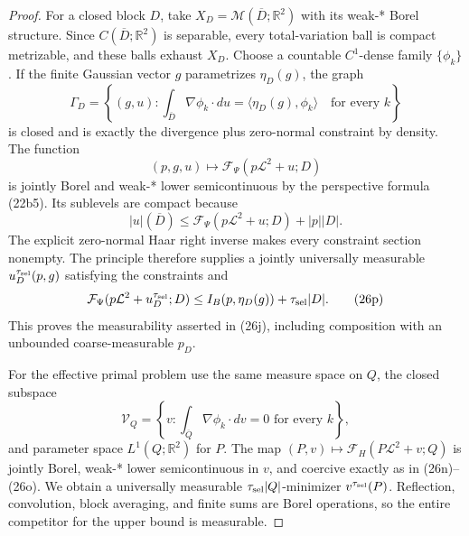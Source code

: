 \documentclass{aomart}
\theoremstyle{definition}
\newcommand{\1}{\mathbf 1}
\begin{document}
\begin{proof}
For a closed block $D$, take
$X_ D=\mathcal M(\overline D;\mathbb R^2)$ with its weak-* Borel
structure.  Since $C(\overline D;\mathbb R^2)$ is separable, every
total-variation ball is compact metrizable, and these balls exhaust
$X_ D$.  Choose a countable $C^1$-dense family $\{\phi_ k\}$.  If
the finite Gaussian vector $g$ parametrizes $\eta_ D(g)$, the graph
\begin{equation}
\Gamma_ D=\left\{(g,u):
\int_ {\overline D}\nabla\phi_ k\cdot du
=\langle\eta_ D(g),\phi_ k\rangle\quad\text{for every }k\right\}
\tag{26m}
\end{equation}
is closed and is exactly the divergence plus zero-normal constraint by
density.  The function
\begin{equation}
(p,g,u)\longmapsto\mathcal F_ \Psi(p\mathcal L^2+u;D)
\tag{26n}
\end{equation}
is jointly Borel and weak-* lower semicontinuous by the perspective
formula (22b5).  Its sublevels are compact because
\begin{equation}
|u|(\overline D)\leq
\mathcal F_ \Psi(p\mathcal L^2+u;D)+|p||D|.
\tag{26o}
\end{equation}
The explicit zero-normal Haar right inverse makes every constraint
section nonempty.  The principle therefore supplies a jointly
universally measurable $u_ D^{\tau_{\rm sel}}(p,g)$ satisfying the constraints
and
\begin{equation}
\mathcal F_ \Psi(p\mathcal L^2+u_ D^{\tau_{\rm sel}};D)
\leq I_ B(p,\eta_ D(g))+\tau_{\rm sel}|D|.
\tag{26p}
\end{equation}
This proves the measurability asserted in (26j), including composition
with an unbounded coarse-measurable $p_ D$.

For the effective primal problem use the same measure space on $Q$,
the closed subspace
\begin{equation*}
\mathscr V_ Q=\left\{v:\int_ {\overline Q}\nabla\phi_ k\cdot dv=0
\text{ for every }k\right\},
\end{equation*}
and parameter space $L^1(Q;\mathbb R^2)$ for $P$.  The map
$(P,v)\mapsto\mathcal F_ H(P\mathcal L^2+v;Q)$ is jointly Borel,
weak-* lower semicontinuous in $v$, and coercive exactly as in
(26n)--(26o).  We obtain a universally measurable
$\tau_{\rm sel}|Q|$-minimizer $v^{\tau_{\rm sel}}(P)$.  Reflection, convolution,
block averaging, and finite sums are Borel operations, so the entire
competitor for the upper bound is measurable.


\end{proof}
\end{document}
